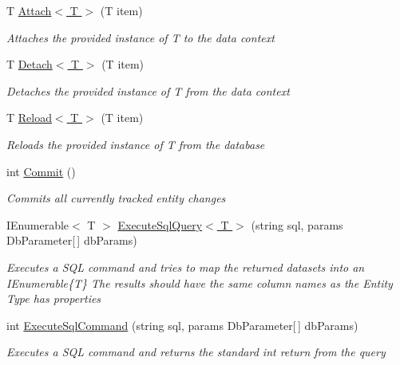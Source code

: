 \begin{DoxyCompactItemize}
T \hyperlink{class_highway_1_1_data_1_1_object_data_context_a632c683e76a677a54c93ad46c04f0a2c}{Attach$<$ T $>$} (T item)
\begin{DoxyCompactList}\small\item\em Attaches the provided instance of {\itshape T}  to the data context \end{DoxyCompactList}\item 
T \hyperlink{class_highway_1_1_data_1_1_object_data_context_a35b4f068d2b1fe3aa87fe23127c82ea9}{Detach$<$ T $>$} (T item)
\begin{DoxyCompactList}\small\item\em Detaches the provided instance of {\itshape T}  from the data context \end{DoxyCompactList}\item 
T \hyperlink{class_highway_1_1_data_1_1_object_data_context_a8012b2235781cd84e3b5a4c8f90f0627}{Reload$<$ T $>$} (T item)
\begin{DoxyCompactList}\small\item\em Reloads the provided instance of {\itshape T}  from the database \end{DoxyCompactList}\item 
int \hyperlink{class_highway_1_1_data_1_1_object_data_context_af757c0a88ca932751e70fd569ae8f137}{Commit} ()
\begin{DoxyCompactList}\small\item\em Commits all currently tracked entity changes \end{DoxyCompactList}\item 
I\-Enumerable$<$ T $>$ \hyperlink{class_highway_1_1_data_1_1_object_data_context_aa93f35fdeb68aa4e0e6f7ed21ab8178a}{Execute\-Sql\-Query$<$ T $>$} (string sql, params Db\-Parameter\mbox{[}$\,$\mbox{]} db\-Params)
\begin{DoxyCompactList}\small\item\em Executes a S\-Q\-L command and tries to map the returned datasets into an I\-Enumerable\{\-T\} The results should have the same column names as the Entity Type has properties \end{DoxyCompactList}\item 
int \hyperlink{class_highway_1_1_data_1_1_object_data_context_aecb019a79c5201a4d041b3ae38158361}{Execute\-Sql\-Command} (string sql, params Db\-Parameter\mbox{[}$\,$\mbox{]} db\-Params)
\begin{DoxyCompactList}\small\item\em Executes a S\-Q\-L command and returns the standard int return from the query \end{DoxyCompactList}\end{DoxyCompactItemize}
